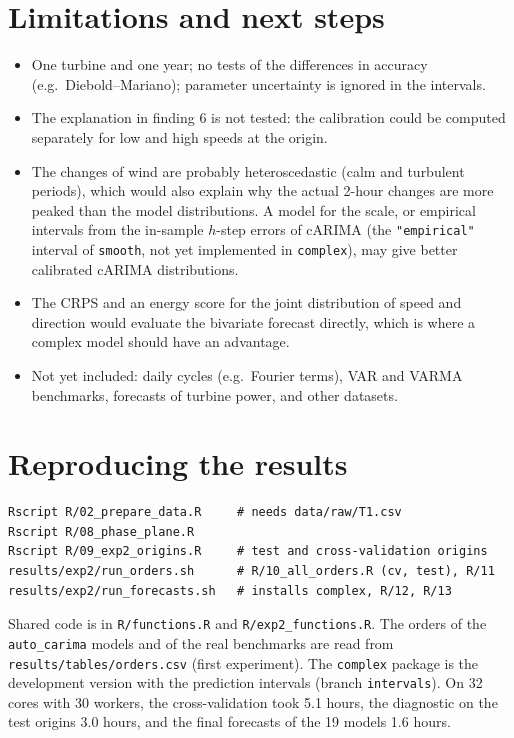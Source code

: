 \documentclass[11pt,a4paper]{article}
\newcommand{\code}[1]{\texttt{#1}}
\newcommand{\1}{\mathbf{1}}
\begin{document}
\section{Limitations and next steps}

\begin{itemize}
  \item One turbine and one year; no tests of the differences in accuracy (e.g.\
    Diebold--Mariano); parameter uncertainty is ignored in the intervals.
  \item The explanation in finding 6 is not tested: the calibration could be computed separately
    for low and high speeds at the origin.
  \item The changes of wind are probably heteroscedastic (calm and turbulent periods), which would
    also explain why the actual 2-hour changes are more peaked than the model distributions. A
    model for the scale, or empirical intervals from the in-sample $h$-step errors of cARIMA (the
    \code{"empirical"} interval of \code{smooth}, not yet implemented in \code{complex}), may give
    better calibrated cARIMA distributions.
  \item The CRPS and an energy score for the joint distribution of speed and direction would
    evaluate the bivariate forecast directly, which is where a complex model should have an
    advantage.
  \item Not yet included: daily cycles (e.g.\ Fourier terms), VAR and VARMA benchmarks, forecasts
    of turbine power, and other datasets.
\end{itemize}

\section{Reproducing the results}\label{sec:reproduce}

\begin{verbatim}
Rscript R/02_prepare_data.R     # needs data/raw/T1.csv
Rscript R/08_phase_plane.R
Rscript R/09_exp2_origins.R     # test and cross-validation origins
results/exp2/run_orders.sh      # R/10_all_orders.R (cv, test), R/11
results/exp2/run_forecasts.sh   # installs complex, R/12, R/13
\end{verbatim}

\noindent Shared code is in \code{R/functions.R} and \code{R/exp2\_functions.R}. The orders of the
\code{auto\_carima} models and of the real benchmarks are read from
\code{results/tables/orders.csv} (first experiment). The \code{complex} package is the development
version with the prediction intervals (branch \code{intervals}). On 32 cores with 30 workers,
the cross-validation took 5.1 hours, the diagnostic on the test origins 3.0 hours, and the final
forecasts of the 19 models 1.6 hours.
\end{document}

